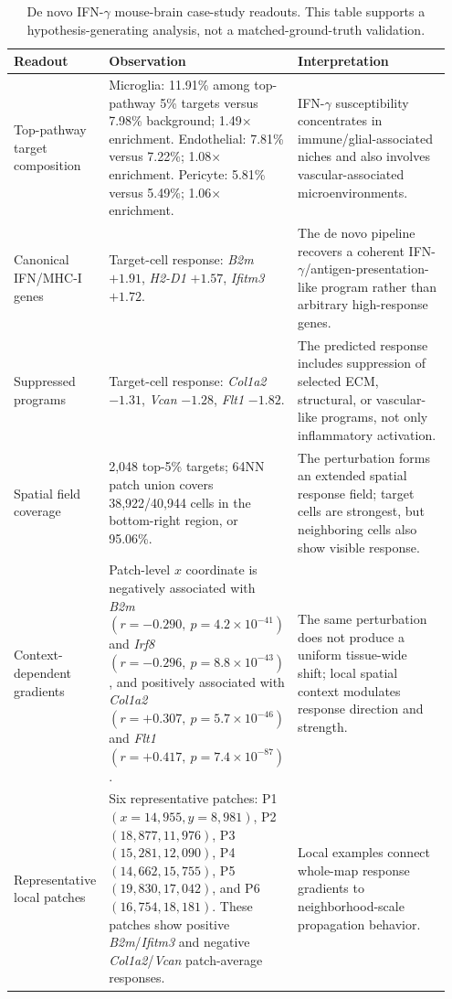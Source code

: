 \documentclass[sigconf,anonymous,review]{acmart}
\begin{document}
\begin{table}[t]
\centering
\caption{De novo IFN-$\gamma$ mouse-brain case-study readouts. This table supports a hypothesis-generating analysis, not a matched-ground-truth validation.}
\label{tab:app_ifng_case_readouts}
\footnotesize
\setlength{\tabcolsep}{4pt}
\renewcommand{\arraystretch}{1.16}
\begin{tabular}{@{}p{0.18\linewidth}p{0.40\linewidth}p{0.37\linewidth}@{}}
\toprule
Readout & Observation & Interpretation \\
\midrule
Top-pathway target composition &
Microglia: 11.91\% among top-pathway 5\% targets versus 7.98\% background; 1.49$\times$ enrichment. Endothelial: 7.81\% versus 7.22\%; 1.08$\times$ enrichment. Pericyte: 5.81\% versus 5.49\%; 1.06$\times$ enrichment. &
IFN-$\gamma$ susceptibility concentrates in immune/glial-associated niches and also involves vascular-associated microenvironments. \\

Canonical IFN/MHC-I genes &
Target-cell response: \textit{B2m} $+1.91$, \textit{H2-D1} $+1.57$, \textit{Ifitm3} $+1.72$. &
The de novo pipeline recovers a coherent IFN-$\gamma$/antigen-presentation-like program rather than arbitrary high-response genes. \\

Suppressed programs &
Target-cell response: \textit{Col1a2} $-1.31$, \textit{Vcan} $-1.28$, \textit{Flt1} $-1.82$. &
The predicted response includes suppression of selected ECM, structural, or vascular-like programs, not only inflammatory activation. \\

Spatial field coverage &
2,048 top-5\% targets; 64NN patch union covers 38,922/40,944 cells in the bottom-right region, or 95.06\%. &
The perturbation forms an extended spatial response field; target cells are strongest, but neighboring cells also show visible response. \\

Context-dependent gradients &
Patch-level $x$ coordinate is negatively associated with \textit{B2m} $(r=-0.290,\ p=4.2\times10^{-41})$ and \textit{Irf8} $(r=-0.296,\ p=8.8\times10^{-43})$, and positively associated with \textit{Col1a2} $(r=+0.307,\ p=5.7\times10^{-46})$ and \textit{Flt1} $(r=+0.417,\ p=7.4\times10^{-87})$. &
The same perturbation does not produce a uniform tissue-wide shift; local spatial context modulates response direction and strength. \\

Representative local patches &
Six representative patches: P1 $(x=14{,}955, y=8{,}981)$, P2 $(18{,}877, 11{,}976)$, P3 $(15{,}281, 12{,}090)$, P4 $(14{,}662, 15{,}755)$, P5 $(19{,}830, 17{,}042)$, and P6 $(16{,}754, 18{,}181)$. These patches show positive \textit{B2m}/\textit{Ifitm3} and negative \textit{Col1a2}/\textit{Vcan} patch-average responses. &
Local examples connect whole-map response gradients to neighborhood-scale propagation behavior. \\


\end{tabular}
\end{table}
\end{document}
